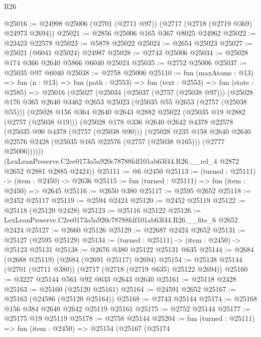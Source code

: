 \begin{lexlean}{R26}
\begin{coremodule}
@25016 := @24998 @25006 (@2701 (@2711 @97)) (@2717 (@2718 (@2719 @369) @24973 @2694))
@25021 := @2856 @25006 @165 @367 @8025 @24962
@25022 := @23423 @22578
@25023 := @5878 @25022
@25024 := @2654 @25023
@25027 := @25021 (@6041 @25024) @24987
@25028 := @2743 @25006
@25034 := @25028 @174 @366 @2640 @5866 @6040 @25024
@25035 := @2752 @25006
@25037 := @25035 @97 @6040
@25038 := @2758 @25006
@25110 := fun (maxAtoms : @13) =>
  fun (n : @13) =>
  fun (path : @2553) =>
  fun (text : @2553) =>
  fun (state : @2585) =>
  @25016
    (@25027
      (@25034
        (@25037 (@2757 (@25038 @97)))
        (@25028
          @176
          @365
          @2640
          @3462
          @2653
          @25023
          (@25035 @55 @2653 (@2757 (@25038 @55)))
          (@25028
            @156
            @364
            @2640
            @2643
            @2882
            @25022
            (@25035 @19 @2882 (@2757 (@25038 @19)))
            (@25028
              @178
              @336
              @2640
              @2642
              @4378
              @22578
              (@25035 @90 @4378 (@2757 (@25038 @90)))
              (@25028
                @235
                @158
                @2640
                @2640
                @22576
                @2428
                (@25035 @165 @22576 (@2757 (@25038 @165)))
                (@2777 @25006))))))
      (LexLeanPreserve.C2ee0173a5a920c78788fdf101ab63f44.R26.__rel_4 @2872 @2652 @2881 @2885 @2424))
@25111 := @6 @2450
@25113 := (turned : @25111) -> (item : @2450) -> @2636
@25115 := fun (turned : @25111) => fun (item : @2450) => @2645
@25116 := @2650 @380
@25117 := @2595 @2652
@25118 := @2452 @25117
@25119 := @2594 @2424
@25120 := @2452 @25119
@25122 := @25118 (@25120 @2428)
@25123 := @25116 @25122
@25126 := LexLeanPreserve.C2ee0173a5a920c78788fdf101ab63f44.R26.__fits_6 @2652 @2424
@25127 := @2660 @25126
@25129 := @22687 @2424 @2652
@25131 := @25127 (@2595 @25129)
@25134 := (turned : @25111) -> (item : @2450) -> @25123 @25131
@25138 := @2676 @380 @25122 @25131 @635
@25144 := @2684 (@2688 @25119) (@2684 (@2691 @25117) @2694)
@25154 := @25138 @25144 (@2701 (@2711 @380)) (@2717 (@2718 (@2719 @635) @25122 @2694))
@25160 := @3227 @25144 @561 @92 @633 @2643 @2640
@25161 := @25118 @2428
@25163 := @25160 (@25120 @25161)
@25164 := @24591 @2652
@25167 := @25163 (@24586 (@25120 @25164))
@25168 := @2743 @25144
@25174 := @25168 @156 @384 @2640 @2642 @25119 @25161
@25175 := @2752 @25144
@25177 := @25175 @19 @25119
@25178 := @2758 @25144
@25204 := fun (turned : @25111) =>
  fun (item : @2450) =>
  @25154
    (@25167
      (@25174

\end{coremodule}
\end{lexlean}
